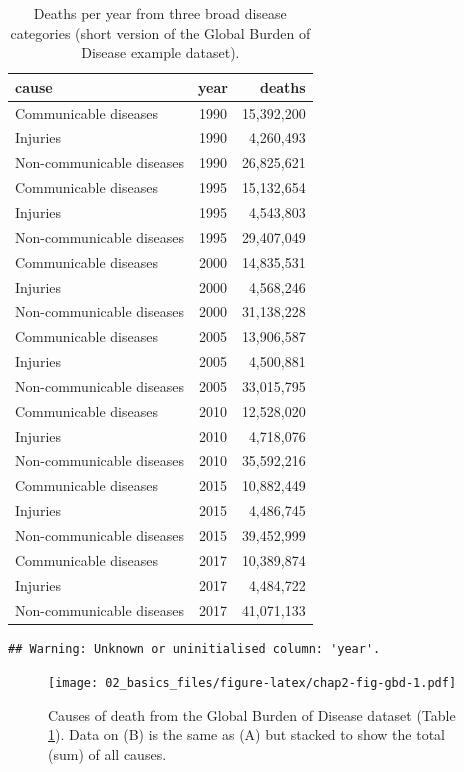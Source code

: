 \documentclass[12pt,]{krantz}
\theoremstyle{definition}
\theoremstyle{definition}
\theoremstyle{definition}
\theoremstyle{remark}
\begin{document}
\begin{table}[t]

\caption{\label{tab:chap2-tab-gbd}Deaths per year from three broad disease categories (short version of the Global Burden of Disease example dataset).}
\centering
\fontsize{8}{10}\selectfont
\begin{tabular}{lcr}
\toprule
cause & year & deaths\\
\midrule
Communicable diseases & 1990 & 15,392,200\\
Injuries & 1990 & 4,260,493\\
Non-communicable diseases & 1990 & 26,825,621\\
\addlinespace
Communicable diseases & 1995 & 15,132,654\\
Injuries & 1995 & 4,543,803\\
Non-communicable diseases & 1995 & 29,407,049\\
\addlinespace
Communicable diseases & 2000 & 14,835,531\\
Injuries & 2000 & 4,568,246\\
Non-communicable diseases & 2000 & 31,138,228\\
\addlinespace
Communicable diseases & 2005 & 13,906,587\\
Injuries & 2005 & 4,500,881\\
Non-communicable diseases & 2005 & 33,015,795\\
\addlinespace
Communicable diseases & 2010 & 12,528,020\\
Injuries & 2010 & 4,718,076\\
Non-communicable diseases & 2010 & 35,592,216\\
\addlinespace
Communicable diseases & 2015 & 10,882,449\\
Injuries & 2015 & 4,486,745\\
Non-communicable diseases & 2015 & 39,452,999\\
\addlinespace
Communicable diseases & 2017 & 10,389,874\\
Injuries & 2017 & 4,484,722\\
Non-communicable diseases & 2017 & 41,071,133\\
\bottomrule
\end{tabular}
\end{table}

\begin{verbatim}
## Warning: Unknown or uninitialised column: 'year'.
\end{verbatim}

\begin{figure}
\centering
\texttt{[image: 02\_basics\_files/figure-latex/chap2-fig-gbd-1.pdf]}
\caption{\label{fig:chap2-fig-gbd}Causes of death from the Global Burden of
Disease dataset (Table \ref{tab:chap2-tab-gbd}). Data on (B) is the same
as (A) but stacked to show the total (sum) of all causes.}
\end{figure}
\end{document}
